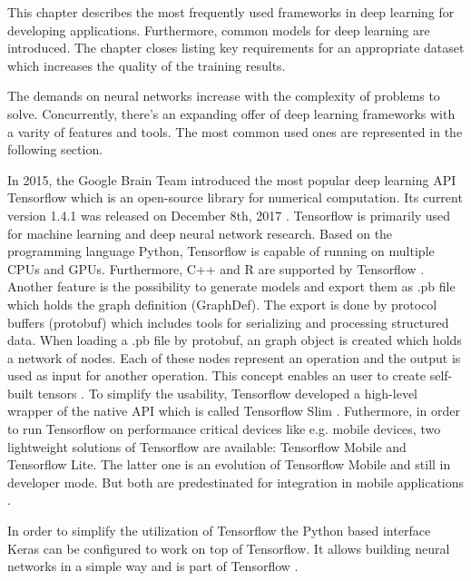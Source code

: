 This chapter describes the most frequently used frameworks in deep learning for developing applications. Furthermore, common models for deep learning are introduced. The chapter closes listing key requirements for an appropriate dataset which increases the quality of the training results.

The demands on neural networks increase with the complexity of problems to solve. Concurrently, there's an expanding offer of deep learning frameworks with a varity of features and tools. The most common used ones are represented in the following section.

In 2015, the Google Brain Team introduced the most popular deep learning API Tensorflow which is an open-source library for numerical computation. Its current version 1.4.1 was released on December 8th, 2017 \citep{Tensorflow2017}. Tensorflow is primarily used for machine learning and deep neural network research. Based on the programming language Python, Tensorflow is capable of running on multiple CPUs and GPUs. Furthermore, C++ and R are supported by Tensorflow \citep{Varangaonkar2017}. Another feature is the possibility to generate models and export them as .pb file which holds the graph definition (GraphDef). The export is done by protocol buffers (protobuf) which includes tools for serializing and processing structured data. When loading a .pb file by protobuf, an graph object is created which holds a network of nodes. Each of these nodes represent an operation and the output is used as input for another operation. This concept enables an user to create self-built tensors \citep{TensorFlowModel2017}. To simplify the usability, Tensorflow developed a high-level wrapper of the native API which is called Tensorflow Slim \citep{TensorflowSlim}. Futhermore, in order to run Tensorflow on performance critical devices like e.g. mobile devices, two lightweight solutions of Tensorflow are available: Tensorflow Mobile and Tensorflow Lite. The latter one is an evolution of Tensorflow Mobile and still in developer mode. But both are predestinated for integration in mobile applications \citep{TensorFlowMobile}.

In order to simplify the utilization of Tensorflow the Python based interface Keras can be configured to work on top of Tensorflow. It allows building neural networks in a simple way and is part of Tensorflow \citep{Varangaonkar2017}.


